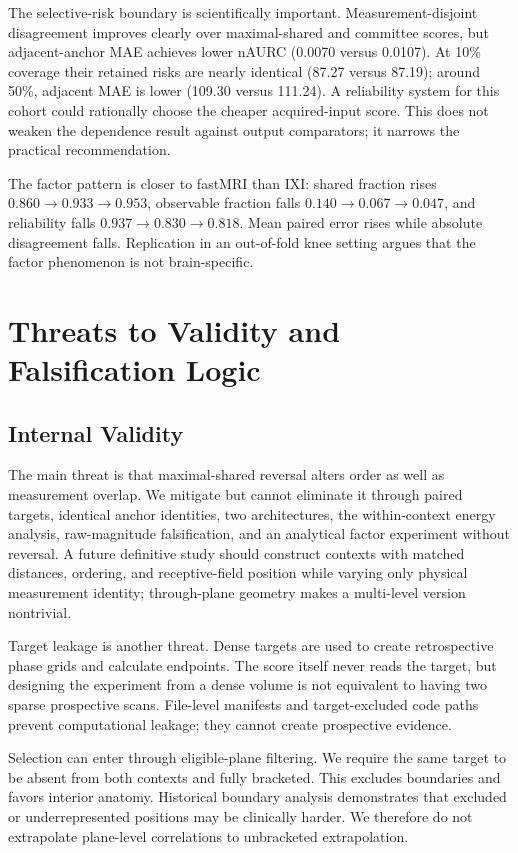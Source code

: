 \documentclass[journal,10pt]{IEEEtran}
\begin{document}
The selective-risk boundary is scientifically important. Measurement-disjoint disagreement improves clearly over maximal-shared and committee scores, but adjacent-anchor MAE achieves lower nAURC (0.0070 versus 0.0107). At 10\% coverage their retained risks are nearly identical (87.27 versus 87.19); around 50\%, adjacent MAE is lower (109.30 versus 111.24). A reliability system for this cohort could rationally choose the cheaper acquired-input score. This does not weaken the dependence result against output comparators; it narrows the practical recommendation.

The factor pattern is closer to fastMRI than IXI: shared fraction rises $0.860\rightarrow0.933\rightarrow0.953$, observable fraction falls $0.140\rightarrow0.067\rightarrow0.047$, and reliability falls $0.937\rightarrow0.830\rightarrow0.818$. Mean paired error rises while absolute disagreement falls. Replication in an out-of-fold knee setting argues that the factor phenomenon is not brain-specific.

\section{Threats to Validity and Falsification Logic}
\subsection{Internal Validity}
The main threat is that maximal-shared reversal alters order as well as measurement overlap. We mitigate but cannot eliminate it through paired targets, identical anchor identities, two architectures, the within-context energy analysis, raw-magnitude falsification, and an analytical factor experiment without reversal. A future definitive study should construct contexts with matched distances, ordering, and receptive-field position while varying only physical measurement identity; through-plane geometry makes a multi-level version nontrivial.

Target leakage is another threat. Dense targets are used to create retrospective phase grids and calculate endpoints. The score itself never reads the target, but designing the experiment from a dense volume is not equivalent to having two sparse prospective scans. File-level manifests and target-excluded code paths prevent computational leakage; they cannot create prospective evidence.

Selection can enter through eligible-plane filtering. We require the same target to be absent from both contexts and fully bracketed. This excludes boundaries and favors interior anatomy. Historical boundary analysis demonstrates that excluded or underrepresented positions may be clinically harder. We therefore do not extrapolate plane-level correlations to unbracketed extrapolation.
\end{document}
